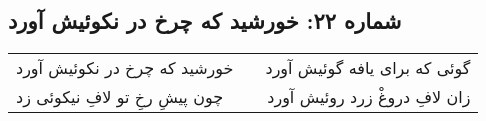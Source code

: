 \begin{center}
\section*{شماره ۲۲: خورشید که چرخ در نکوئیش آورد}
\label{sec:022}
\begin{longtable}{l p{0.5cm} r}
خورشید که چرخ در نکوئیش آورد
&&
گوئی که برای یافه گوئیش آورد
\\
چون پیشِ رخِ تو لافِ نیکوئی زد
&&
زان لافِ دروغْ زرد روئیش آورد
\\
\end{longtable}
\end{center}
